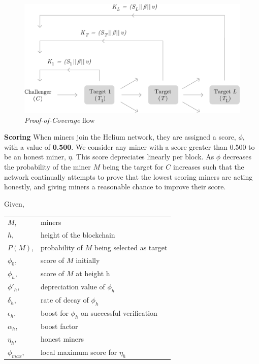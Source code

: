 \documentclass[10pt, nonatbib, nocopyrightspace, reprint]{sigplanconf}
\begin{document}
\begin{figure}[H]
    \begin{center}
          \includegraphics[width=\columnwidth]{o_propagation.eps}
          \caption{\emph{Proof-of-Coverage} flow}
          \label{fig:poc-propogation}
     \end{center}
\end{figure}

\textbf{Scoring} \label{scores} When miners join the Helium network, they are assigned a score, $\phi$, with a value of \textbf{0.500}. We consider any miner with a score greater than 0.500 to be an honest miner, $\eta$. This score depreciates linearly per block. As $\phi$ decreases the probability of the miner $M$ being the target for $C$ increases such that the network continually attempts to prove that the lowest scoring miners are acting honestly, and giving miners a reasonable chance to improve their score.

Given,\newline
\begin{tabular}{l l}
	$M$,       	  & miners                                         \\
	$h$,          & height of the blockchain                       \\
	$P(M)$,       & probability of $M$ being selected as target    \\
	$\phi_0$,     & score of $M$ initially                         \\
	$\phi_h$,     & score of $M$ at height h                       \\
	$\phi'_h$,    & depreciation value of $\phi_h$                 \\
	$\delta_h$,   & rate of decay of $\phi_h$                      \\
	$\epsilon_h$, & boost for $\phi_h$ on successful verification  \\
	$\alpha_h$,   & boost factor                                   \\
	$\eta_h$,     & honest miners                                  \\
	$\phi_{max}$, & local maximum score for $\eta_h$               \\
\end{tabular}
\end{document}
